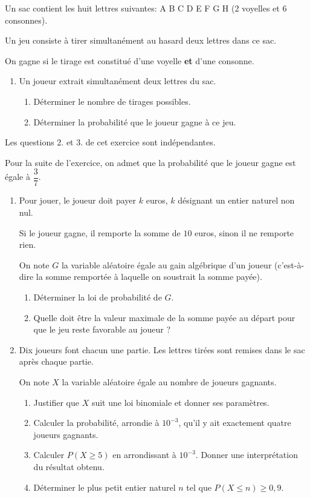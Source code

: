 Un sac contient les huit lettres suivantes: A B C D E F G H (2 voyelles et 6 consonnes).

Un jeu consiste à tirer simultanément au hasard deux lettres dans ce sac.

On gagne si le tirage est constitué d'une voyelle \textbf{et} d'une consonne.

\begin{enumerate}
	\item Un joueur extrait simultanément deux lettres du sac.
	\begin{enumerate}
		\item Déterminer le nombre de tirages possibles.
		\item Déterminer la probabilité que le joueur gagne à ce jeu.
	\end{enumerate}
\end{enumerate}	
Les questions 2. et 3. de cet exercice sont indépendantes.

Pour la suite de l'exercice, on admet que la probabilité que le joueur gagne est égale à $\dfrac{3}{7}$.

\begin{enumerate}[resume]
	\item Pour jouer, le joueur doit payer $k$ euros, $k$ désignant un entier naturel non nul. 
	
	Si le joueur gagne, il remporte la somme de $10$ euros, sinon il ne remporte rien.
	
	On note $G$ la variable aléatoire égale au gain algébrique d'un joueur (c'est-à-dire la somme remportée à laquelle on soustrait la somme payée).
	\begin{enumerate}
		\item Déterminer la loi de probabilité de $G$.
		\item Quelle doit être la valeur maximale de la somme payée au départ pour que le jeu reste
		favorable au joueur ?
	\end{enumerate}
	\item Dix joueurs font chacun une partie. Les lettres tirées sont remises dans le sac après chaque partie.
	
	On note $X$ la variable aléatoire égale au nombre de joueurs gagnants.
	\begin{enumerate}
		\item Justifier que $X$ suit une loi binomiale et donner ses paramètres.
		\item Calculer la probabilité, arrondie à $10^{-3}$, qu'il y ait exactement quatre joueurs gagnants. 
		\item Calculer $P(X \geqslant 5)$ en arrondissant à $10^{-3}$. Donner une interprétation du résultat obtenu. 
		\item Déterminer le plus petit entier naturel $n$ tel que $P(X \leqslant n) \geqslant 0,9$.
	\end{enumerate}
\end{enumerate}

